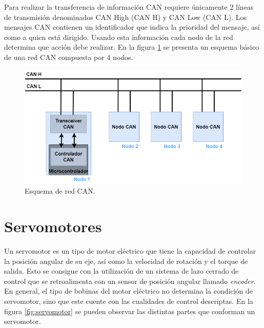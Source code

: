 Para realizar la transferencia de información CAN requiere únicamente 2 líneas de transmisión denominados CAN High (CAN H) y CAN Low (CAN L). Los mensajes CAN contienen un identificador que indica la prioridad del mensaje, así como a quien está dirigido. Usando esta información cada nodo de la red determina que acción debe realizar. En la figura \ref{fig:canBus} se presenta un esquema básico de una red CAN compuesta por 4 nodos.

\newpage

\begin{figure}[h!]
	\centering
	\includegraphics[scale=.5]{./Figures/CANBUS_Esquema.png}
	\caption{Esquema de red CAN.}
	\label{fig:canBus}
\end{figure}


\section{Servomotores}

Un servomotor \citep{Industrial_Automation_Hands_On} es un tipo de motor eléctrico que tiene la capacidad de controlar la posición angular de su eje, así como la velocidad de rotación y el torque de salida. Esto se consigue con la utilización de un sistema de lazo cerrado de control que se retroalimenta con un sensor de posición angular llamado \textit{encoder}. En general, el tipo de bobinas del motor eléctrico no determina la condición de servomotor, sino que este cuente con las cualidades de control descriptas. En la figura \ref{fig:servomotor} \citep{web_partes_servomotor} se pueden observar las distintas partes que conforman un servomotor.

